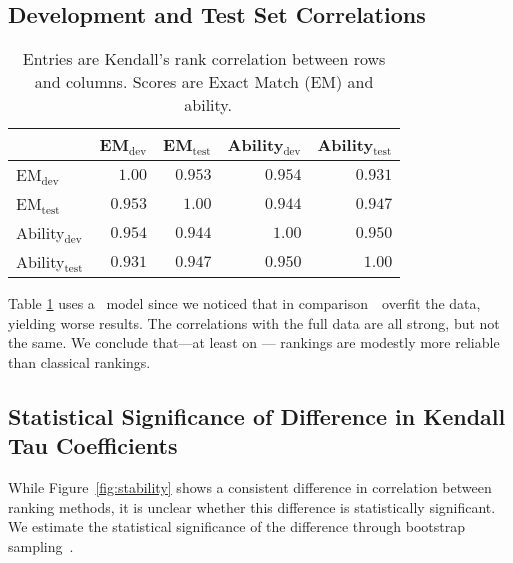 \subsection{Development and Test Set Correlations}
\begin{table}[t]
  \centering
  \small
  \begin{tabular}{lrrrr}
    \toprule
    {}                      & EM$_{\text{dev}}$ & EM$_{\text{test}}$ & Ability$_{\text{dev}}$ & Ability$_{\text{test}}$ \\
    \midrule
    EM$_{\text{dev}}$       & $1.00$            & $0.953$            & $0.954$                & $0.931$                 \\
    EM$_{\text{test}}$      & $0.953$           & $1.00$             & $0.944$                & $0.947$                 \\
    Ability$_{\text{dev}}$  & $0.954$           & $0.944$            & $1.00$                 & $0.950$                 \\
    Ability$_{\text{test}}$ & $0.931$           & $0.947$            & $0.950$                & $1.00$                  \\
    \bottomrule
  \end{tabular}
  \caption{
    Entries are Kendall's rank correlation between rows and columns.
    Scores are \squad{} Exact Match (EM) and ~ability.
  }
  \label{tab:rank-corr}
\end{table}

Table \ref{tab:rank-corr} uses a ~model since we noticed that in comparison~~overfit the data, yielding worse results.
The correlations with the full data are all strong, but not the same.
We conclude that---at least on \squad{}---\irt{} rankings are modestly more reliable than classical rankings.

\subsection{Statistical Significance of Difference in Kendall Tau Coefficients}
While Figure~\ref{fig:stability} shows a consistent difference in correlation between ranking methods, it is unclear whether this difference is statistically significant.
We estimate the statistical significance of the difference through bootstrap sampling~\citep{efron1994bootstrap}.

